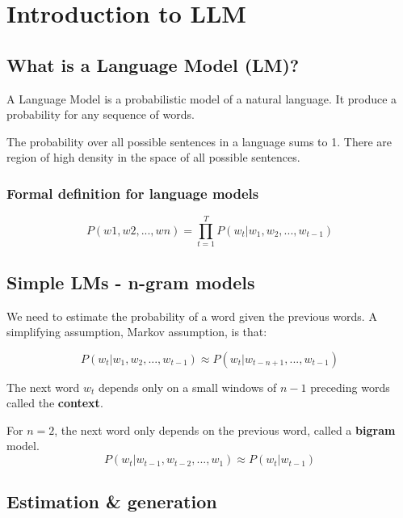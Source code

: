 \chapter{Introduction to LLM}

\section{What is a Language Model (LM)?}

A Language Model is a probabilistic model of a natural language. It produce a probability for any sequence of words.

The probability over all possible sentences in a language sums to 1.
There are region of high density in the space of all possible sentences.

\subsection{Formal definition for language models}

\begin{equation*}
  P(w1, w2, ..., wn) = \prod_{t=1}^{T} P(w_t | w_1, w_2, ..., w_{t-1})
\end{equation*}


\section{Simple LMs - n-gram models}

We need to estimate the probability of a word given the previous words.
A simplifying assumption, Markov assumption, is that:

\begin{equation*}
  P(w_t | w_1, w_2, ..., w_{t-1}) \approx P(w_t | w_{t-n+1}, ..., w_{t-1})
\end{equation*}

The next word $w_t$ depends only on a small windows of $n-1$ preceding words called the \textbf{context}.


For $n=2$, the next word only depends on the previous word, called a \textbf{bigram} model.
\begin{equation*}
  P(w_t | w_{t-1}, w_{t-2}, ..., w_1) \approx P(w_t | w_{t-1})
\end{equation*}


\section{Estimation \& generation}

